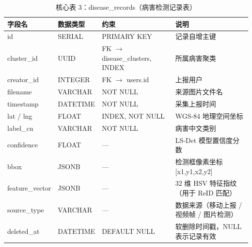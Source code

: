 \documentclass[UTF8, a4paper, fontset=ubuntu]{ctexart}
\begin{document}
\begin{table}[H]
    \centering
    \caption{核心表 3：disease\_records（病害检测记录表）}
    \begin{tabular}{lp{3cm}lp{5cm}}
        \toprule
        字段名 & 数据类型 & 约束 & 说明 \\ \midrule
        id             & SERIAL   & PRIMARY KEY          & 记录自增主键 \\
        cluster\_id    & UUID     & FK $\rightarrow$ disease\_clusters, INDEX & 所属病害聚类 \\
        creator\_id    & INTEGER  & FK $\rightarrow$ users.id        & 上报用户 \\
        filename       & VARCHAR  & NOT NULL             & 来源图片文件名 \\
        timestamp      & DATETIME & NOT NULL             & 采集上报时间 \\
        lat / lng      & FLOAT    & INDEX, NOT NULL      & WGS-84 地理空间坐标 \\
        label\_cn      & VARCHAR  & NOT NULL             & 病害中文类别 \\
        confidence     & FLOAT    & ---                  & LS-Det 模型置信度分数 \\
        bbox           & JSONB    & ---                  & 检测框像素坐标 [x1,y1,x2,y2] \\
        feature\_vector & JSONB   & ---                  & 32 维 HSV 特征指纹（用于 ReID 匹配） \\
        source\_type   & VARCHAR  & ---                  & 数据来源（移动上报 / 视频帧 / 图片检测） \\
        deleted\_at    & DATETIME & DEFAULT NULL         & 软删除时间戳，NULL 表示记录有效 \\
        \bottomrule
    \end{tabular}
\end{table}
\end{document}
